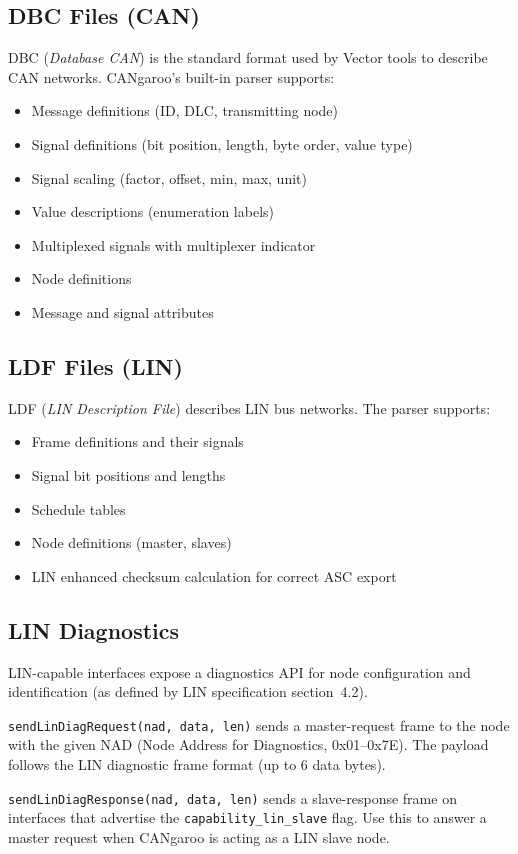 \documentclass[a4paper,11pt]{article}
\begin{document}
\subsection{DBC Files (CAN)}

DBC (\textit{Database CAN}) is the standard format used by Vector tools to describe
CAN networks. CANgaroo's built-in parser supports:

\begin{itemize}
  \item Message definitions (ID, DLC, transmitting node)
  \item Signal definitions (bit position, length, byte order, value type)
  \item Signal scaling (factor, offset, min, max, unit)
  \item Value descriptions (enumeration labels)
  \item Multiplexed signals with multiplexer indicator
  \item Node definitions
  \item Message and signal attributes
\end{itemize}

\subsection{LDF Files (LIN)}

LDF (\textit{LIN Description File}) describes LIN bus networks. The parser supports:

\begin{itemize}
  \item Frame definitions and their signals
  \item Signal bit positions and lengths
  \item Schedule tables
  \item Node definitions (master, slaves)
  \item LIN enhanced checksum calculation for correct ASC export
\end{itemize}

\subsection{LIN Diagnostics}

LIN-capable interfaces expose a diagnostics API for node configuration and
identification (as defined by LIN specification section~4.2).

\begin{description}[leftmargin=2em, style=nextline]
  \item[Diagnostic Request (master)]
    \texttt{sendLinDiagRequest(nad, data, len)} sends a master-request frame
    to the node with the given NAD (Node Address for Diagnostics, 0x01--0x7E).
    The payload follows the LIN diagnostic frame format (up to 6 data bytes).

  \item[Diagnostic Response (slave)]
    \texttt{sendLinDiagResponse(nad, data, len)} sends a slave-response frame
    on interfaces that advertise the \texttt{capability\_lin\_slave} flag.
    Use this to answer a master request when CANgaroo is acting as a LIN slave node.
\end{description}
\end{document}
